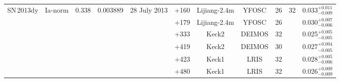 \documentclass[fleqn,usenatbib]{mnras}
\begin{document}
\begin{table}
{\begin{tabular}{l c c c c c c c c c c}
    SN\,2013dy & Ia-norm   & $0.338$  & 0.003889 & 28 July 2013 & +160   & Lijiang-2.4m & YFOSC     & 26& 32 & 0.033$^{+0.011}_{-0.009}$ \\
             &           &          &          &              & +179   & Lijiang-2.4m & YFOSC     & 26&    & 0.030$^{+0.007}_{-0.006}$ \\
             &           &          &          &              & +333   & Keck2    & DEIMOS        & 32&    & 0.025$^{+0.005}_{-0.005}$ \\
             &           &          &          &              & +419   & Keck2    & DEIMOS        & 30&    & 0.027$^{+0.004}_{-0.005}$ \\
             &           &          &          &              & +423   & Keck1    & LRIS          & 32&    & 0.028$^{+0.005}_{-0.006}$ \\
             &           &          &          &              & +480   & Keck1    & LRIS          & 32&    & 0.026$^{+0.009}_{-0.009}$ \\
           	\hline
    \end{tabular} }
\end{table}
\end{document}
